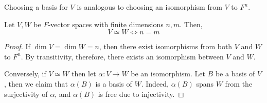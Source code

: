 \begin{remark}
	Choosing a basis for \( V \) is analogous to choosing an isomorphism from \( V \) to \( F^n \).
\end{remark}
\begin{theorem}
	Let \( V, W \) be \( F \)-vector spaces with finite dimensions \( n, m \).
	Then,
	\[
		V \simeq W \iff n = m
	\]
\end{theorem}
\begin{proof}
	If \( \dim V = \dim W = n \), then there exist isomorphisms from both \( V \) and \( W \) to \( F^n \).
	By transitivity, therefore, there exists an isomorphism between \( V \) and \( W \).

	Conversely, if \( V \simeq W \) then let \( \alpha \colon V \to W \) be an isomorphism.
	Let \( B \) be a basis of \( V \), then we claim that \( \alpha(B) \) is a basis of \( W \).
	Indeed, \( \alpha(B) \) spans \( W \) from the surjectivity of \( \alpha \), and \( \alpha(B) \) is free due to injectivity.
\end{proof}

